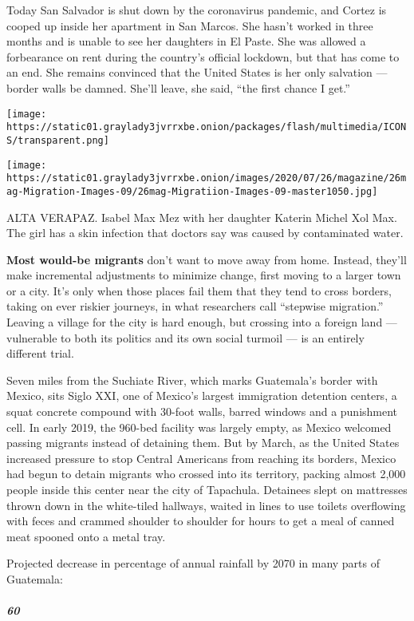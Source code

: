 Today San Salvador is shut down by the coronavirus pandemic, and Cortez
is cooped up inside her apartment in San Marcos. She hasn't worked in
three months and is unable to see her daughters in El Paste. She was
allowed a forbearance on rent during the country's official lockdown,
but that has come to an end. She remains convinced that the United
States is her only salvation --- border walls be damned. She'll leave,
she said, ``the first chance I get.''

\texttt{[image: https://static01.graylady3jvrrxbe.onion/packages/flash/multimedia/ICONS/transparent.png]}

\texttt{[image: https://static01.graylady3jvrrxbe.onion/images/2020/07/26/magazine/26mag-Migration-Images-09/26mag-Migratiion-Images-09-master1050.jpg]}

ALTA VERAPAZ. Isabel Max Mez with her daughter Katerin Michel Xol Max.
The girl has a skin infection that doctors say was caused by
contaminated water.

\textbf{Most would-be migrants} don't want to move away from home.
Instead, they'll make incremental adjustments to minimize change, first
moving to a larger town or a city. It's only when those places fail them
that they tend to cross borders, taking on ever riskier journeys, in
what researchers call ``stepwise migration.'' Leaving a village for the
city is hard enough, but crossing into a foreign land --- vulnerable to
both its politics and its own social turmoil --- is an entirely
different trial.

Seven miles from the Suchiate River, which marks Guatemala's border with
Mexico, sits Siglo XXI, one of Mexico's largest immigration detention
centers, a squat concrete compound with 30-foot walls, barred windows
and a punishment cell. In early 2019, the 960-bed facility was largely
empty, as Mexico welcomed passing migrants instead of detaining them.
But by March, as the United States increased pressure to stop Central
Americans from reaching its borders, Mexico had begun to detain migrants
who crossed into its territory, packing almost 2,000 people inside this
center near the city of Tapachula. Detainees slept on mattresses thrown
down in the white-tiled hallways, waited in lines to use toilets
overflowing with feces and crammed shoulder to shoulder for hours to get
a meal of canned meat spooned onto a metal tray.

Projected decrease in percentage of annual rainfall by 2070 in many
parts of Guatemala:

\hypertarget{60}{%
\subparagraph{60}\label{60}}

